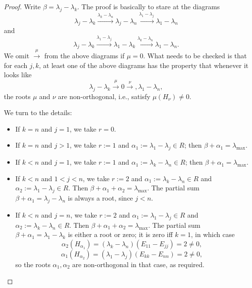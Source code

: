 \documentclass[reqno]{amsart} 
\begin{document}
\begin{proof}
  Write $\beta = \lambda_j - \lambda_k$.  The proof is basically to stare at the diagrams
  \begin{equation*}
    \lambda_j - \lambda_k \xrightarrow{\lambda_k - \lambda_n} \lambda_j - \lambda_n \xrightarrow{\lambda_1 - \lambda_j} \lambda_1 - \lambda_n
  \end{equation*}
  and
  \begin{equation*}
    \lambda_j - \lambda_k \xrightarrow{\lambda_1 - \lambda_j} \lambda_1 - \lambda_k \xrightarrow{\lambda_k - \lambda_n} \lambda_1 - \lambda_n.
  \end{equation*}
  We omit $\xrightarrow{\mu}$ from the above diagrams if $\mu = 0$.  What needs to be checked is that for each $j,k$, at least one of the above diagrams has the property that whenever it looks like
  \begin{equation*}
    \lambda_j - \lambda_k \xrightarrow{\mu } 0 \xrightarrow{\nu}, \lambda_1 - \lambda_n,
  \end{equation*}
  the roots $\mu$ and $\nu$ are non-orthogonal, i.e., satisfy $\mu(H_\nu) \neq 0$.

  We turn to the details:
  \begin{itemize}
  \item If $k = n$ and $j = 1$, we take $r = 0$.
  \item If $k = n$ and $j > 1$, we take $r := 1$ and $\alpha_1 := \lambda_1 - \lambda_j \in R$; then $\beta + \alpha_1 = \lambda_{\max}$.
  \item If $k < n$ and $j = 1$, we take $r := 1$ and $\alpha_1 := \lambda_k - \lambda_n \in R$; then $\beta + \alpha_1 = \lambda_{\max}$.
  \item If $k < n$ and $1 < j < n$, we take $r := 2$ and $\alpha_1 := \lambda_k - \lambda_n \in R$ and $\alpha_2 := \lambda_1 - \lambda_j \in R$.  Then $\beta + \alpha_1 + \alpha_2 = \lambda_{\max}$.  The partial sum $\beta + \alpha_1 = \lambda_j - \lambda_n$ is always a root, since $j < n$.
  \item If $k < n$ and $j = n$, we take $r := 2$ and $\alpha_1 := \lambda_1 - \lambda_j \in R$ and $\alpha_2 := \lambda_k - \lambda_n \in R$.  Then $\beta + \alpha_1 + \alpha_2 = \lambda_{\max}$.  The partial sum $\beta + \alpha_1 = \lambda_1 - \lambda_k$ is either a root or zero; it is zero iff $k = 1$, in which case
    \begin{equation*}
      \alpha_2(H_{\alpha_1}) = (\lambda_k - \lambda_n)(E_{1 1} - E_{j j}) = 2 \neq 0,
    \end{equation*}
    \begin{equation*}
      \alpha_1(H_{\alpha_2}) = (\lambda_1 - \lambda_j)(E_{k k} - E_{n n}) = 2 \neq 0,
    \end{equation*}
    so the roots $\alpha_1,\alpha_2$ are non-orthogonal in that case, as required.
  \end{itemize}
\end{proof}
\end{document}
